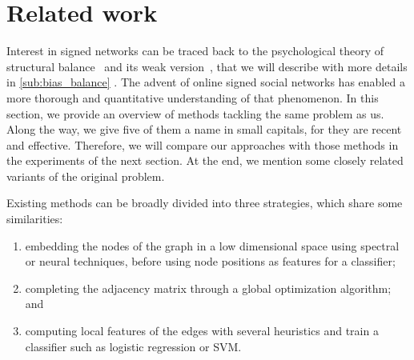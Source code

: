 \section{Related work}
\label{sec:troll_related}

Interest in signed networks can be traced back to the psychological theory of structural
balance~\autocites{Cartwright56}{HeiderBook58} and its weak version~\autocite{davis1967clustering},
that we will describe with more details in \autoref{sub:bias_balance} .
The advent of online signed social networks has enabled a
more thorough and quantitative understanding of that phenomenon. In this section, we provide an
overview of methods tackling the same \esp{} problem as us. Along the way, we give five of them a
name in small capitals, for they are recent and effective. Therefore, we will compare our approaches
with those methods in the experiments of the next section. At the end, we mention some closely
related variants of the original \esp{} problem.

\bigskip

Existing methods can be broadly divided into three strategies, which share some similarities:
\begin{enumerate}[1),nosep]
	\item embedding the nodes of the graph in a low dimensional space using spectral or neural
		techniques, before using node positions as features for a classifier;
	\item completing the adjacency matrix through a global optimization algorithm; and
	\item computing local features of the edges with several heuristics and train a classifier such as
		logistic regression or SVM.
\end{enumerate}

